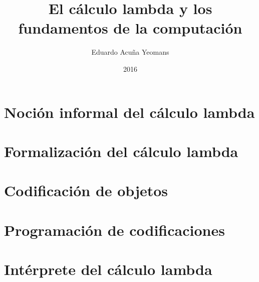 \documentclass[letterpaper,twoside,openright,10pt]{book}
\theoremstyle{indented}
\begin{document}
\title{El cálculo lambda y los fundamentos de la computación}
\author{Eduardo Acuña Yeomans}
\date{2016}

\maketitle

\frontmatter
\tableofcontents

\mainmatter
\chapter{Noción informal del cálculo lambda}
\label{ch:nocion-informal}


\chapter{Formalización del cálculo lambda}
\label{ch:formalizacion}


\chapter{Codificación de objetos}
\label{ch:codificacion}


\appendix

\chapter{Programación de codificaciones}
\label{ap:lambda-scheme}


\chapter{Intérprete del cálculo lambda}
\label{ap:texlambda}


\nocite{*}


\end{document}
